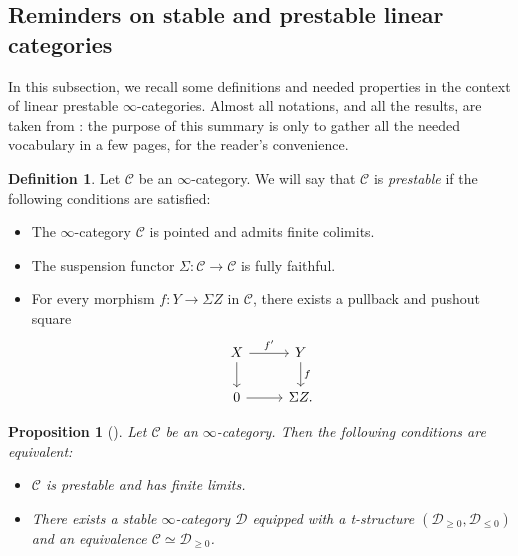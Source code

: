 \documentclass[11pt, twoside]{article} %
\numberwithin{equation}{section}
\theoremstyle{plain}
\newtheorem{prop}[thm]{Proposition}
\theoremstyle{definition}
\newtheorem{defin}[thm]{Definition}
\newcommand{\cc}{\mathcal C}
\newcommand{\cD}{\mathcal D}
\begin{document}
 
	
	\subsection{Reminders on stable and prestable linear categories}\label{section-prestable}
 In this subsection, we recall some definitions and needed properties in the context of linear prestable $\infty$-categories. Almost all notations, and all the results, are taken from \cite{SAG}: the purpose of this summary is only to gather all the needed vocabulary in a few pages, for the reader's convenience.
	\begin{defin}
		Let $\cc$ be an $\infty$-category. We will say that $\cc$ is \textit{prestable} if the following conditions are satisfied:
		\begin{itemize}\item The $\infty$-category $\cc$ is pointed and admits finite colimits.
			\item The suspension functor $\Sigma : \cc \to \cc$ is fully faithful.
			\item For every morphism $f : Y \to\Sigma Z$ in $\cc$, there exists a pullback and pushout square
			$$\begin{tikzcd} X\arrow[r, "f'"]\arrow[d] &Y\arrow[d, "f"]\\ 0 \arrow[r]&\Sigma Z.
			\end{tikzcd}
			$$
		\end{itemize}
	\end{defin}
	
	
	
	\begin{prop}[{\cite[Proposition C.1.2.9]{SAG}}]\label{prestable-as-connective}
		Let $\cc$ be an $\infty$-category. Then the following conditions are equivalent:
		\begin{itemize}\item $\cc$ is prestable and has finite limits.
			\item There exists a stable $\infty$-category $\cD$ equipped with a t-structure $(\cD_{\geq 0}, \cD_{\leq 0})$ and an equivalence $\cc\simeq \cD_{\geq 0}$.
		\end{itemize}
	\end{prop}
	
\end{document}
